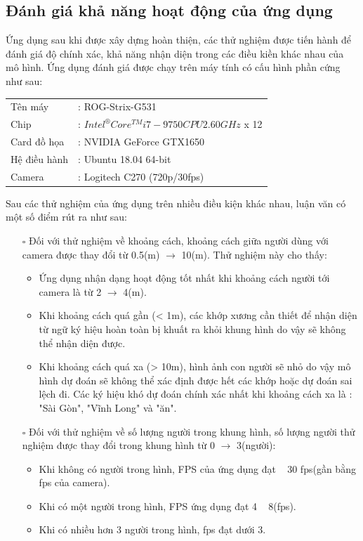 \subsection{Đánh giá khả năng hoạt động của ứng dụng}
Ứng dụng sau khi được xây dựng hoàn thiện, các thử nghiệm được tiến hành để đánh giá độ chính xác, khả năng nhận diện trong các điều kiền khác nhau của mô hình. Ứng dụng đánh giá được chạy trên máy tính có cấu hình phần cứng như sau:

\FloatBarrier
\begin{table}[h]
\centering
\captionsetup{list=no}
\begin{center}
\begin{tabularx}{\columnwidth}{XX}
Tên máy & : ROG-Strix-G531  \\
Chip & : $Intel^{\circledR } Core^{TM} i7-9750 CPU 2.60GHz$ x 12 \\
Card đồ họa & : NVIDIA GeForce GTX1650 \\
Hệ điều hành & : Ubuntu 18.04 64-bit \\
Camera & : Logitech C270 (720p/30fps)
\end{tabularx}
\end{center}
\end{table}
\FloatBarrier

Sau các thử nghiệm của ứng dụng trên nhiều điều kiện khác nhau, luận văn có một số điểm rút ra như sau:

\begin{itemize}
\item[$\square$] Đối với thử nghiệm về khoảng cách, khoảng cách giữa người dùng với camera được thay đổi từ 0.5(m) $\rightarrow$ 10(m). Thử nghiệm này cho thấy:
	\begin{itemize}
	\item Ứng dụng nhận dạng hoạt động tốt nhất khi khoảng cách người tới camera là từ 2 $\rightarrow$ 4(m).
	\item Khi khoảng cách quá gần (< 1m), các khớp xương cần thiết để nhận diện từ ngữ ký hiệu hoàn toàn bị khuất ra khỏi khung hình do vậy sẽ không thể nhận diện được.
	\item Khi khoảng cách quá xa (> 10m), hình ảnh con người sẽ nhỏ do vậy mô hình dự đoán sẽ không thể xác định được hết các khớp hoặc dự đoán sai lệch đi. Các ký hiệu khó dự đoán chính xác nhất khi khoảng cách xa là : "Sài Gòn", "Vĩnh Long" và "ăn".
	\end{itemize}
\end{itemize}

\begin{itemize}
\item[$\square$] Đối với thử nghiệm về số lượng người trong khung hình, số lượng người thử nghiệm được thay đổi trong khung hình từ 0 $\rightarrow$ 3(người):
	\begin{itemize}
	\item Khi không có người trong hình, FPS của ứng dụng đạt ~ 30 fps(gần bằng fps của camera).
	\item Khi có một người trong hình, FPS ứng dụng đạt 4 ~ 8(fps).
	\item Khi có nhiều hơn 3 người trong hình, fps đạt dưới 3.
	\end{itemize}
\end{itemize}